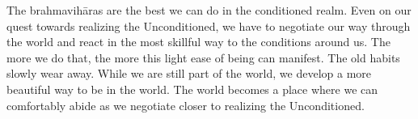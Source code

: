 The brahmavihāras are the best we can do in the conditioned realm. Even on our quest towards realizing the Unconditioned, we have to negotiate our way through the world and react in the most skillful way to the conditions around us. The more we do that, the more this light ease of being can manifest. The old habits slowly wear away. While we are still part of the world, we develop a more beautiful way to be in the world. The world becomes a place where we can comfortably abide as we negotiate closer to realizing the Unconditioned.
